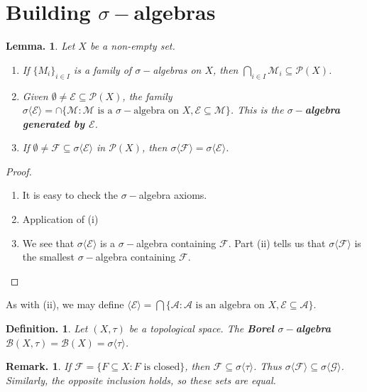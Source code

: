\documentclass[11pt, a4paper]{memoir}
\theoremstyle{change}
\newtheorem{lemma}[theorem]{Lemma.}
\theoremstyle{plain}
\theoremstyle{nonumberplain}
\newtheorem{definition}{Definition.}
\newtheorem{remark}{Remark.}
\newtheorem{proof}{Proof}
\begin{document}
\section{Building \texorpdfstring{$\sigma-$}{s-}algebras}
\begin{lemma}
    Let $X$ be a non-empty set.
    \begin{enumerate}[nolistsep,label=(\roman*)]
        \item If $\{M_i\}_{i\in I}$ is a family of $\sigma-$algebras on $X$, then $\bigcap_{i\in I}\mathcal{M}_i\subseteq\mathcal{P}(X)$.
        \item Given $\emptyset\neq\mathcal{E}\subseteq\mathcal{P}(X)$, the family $\sigma\langle\mathcal{E}\rangle=\cap\{\mathcal{M}:\mathcal{M}\text{ is a $\sigma-$algebra on }X,\mathcal{E}\subseteq\mathcal{M}\}$.
            This is the \textbf{$\sigma-$algebra generated by $\mathcal{E}$}.
        \item If $\emptyset\neq\mathcal{F}\subseteq\sigma\langle\mathcal{E}\rangle$ in $\mathcal{P}(X)$, then $\sigma\langle\mathcal{F}\rangle=\sigma\langle\mathcal{E}\rangle$.
    \end{enumerate}
\end{lemma}
\begin{proof}
    \begin{enumerate}[nolistsep,label=(\roman*)]
        \item It is easy to check the $\sigma-$algebra axioms.
        \item Application of (i)
        \item We see that $\sigma\langle\mathcal{E}\rangle$ is a $\sigma-$algebra containing $\mathcal{F}$.
            Part (ii) tells us that $\sigma\langle\mathcal{F}\rangle$ is the smallest $\sigma-$algebra containing $\mathcal{F}$.
    \end{enumerate}
\end{proof}
As with (ii), we may define $\langle\mathcal{E}\rangle=\bigcap\{\mathcal{A}:\mathcal{A}\text{ is an algebra on }X,\mathcal{E}\subseteq\mathcal{A}\}$.
\begin{definition}
    Let $(X,\tau)$ be a topological space.
    The \textbf{Borel $\sigma-$algebra} $\mathcal{B}(X,\tau)=\mathcal{B}(X)=\sigma\langle\tau\rangle$.
\end{definition}
\begin{remark}
    If $\mathcal{F}=\{F\subseteq X:F\text{ is closed}\}$, then $\mathcal{F}\subseteq\sigma\langle\tau\rangle$.
    Thus $\sigma\langle\mathcal{F}\rangle\subseteq\sigma\langle\mathcal{G}\rangle$.
    Similarly, the opposite inclusion holds, so these sets are equal.
\end{remark}
\end{document}
